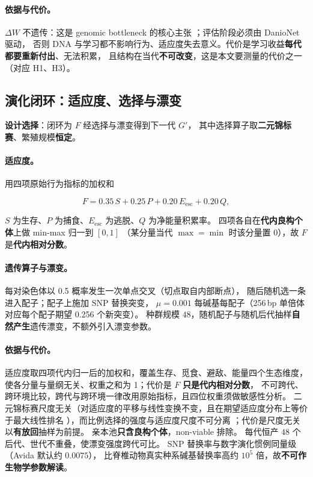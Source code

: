 \paragraph{依据与代价。}$\Delta W$ 不遗传：这是 genomic bottleneck 的核心主张
\citep{bib1_zador2019,bib3_shuvaev2024}；评估阶段必须由 DanioNet 驱动，
否则 DNA 与学习都不影响行为、适应度失去意义。代价是学习收益\textbf{每代都要重新付出}、无法积累，
且结构在当代\textbf{不可改变}，这是本文要测量的代价之一（对应 H1、H3）。

\subsection{演化闭环：适应度、选择与漂变}\label{method:evo}

\textbf{设计选择}：闭环为 $F$ 经选择与漂变得到下一代 $G'$，
其中选择算子取\textbf{二元锦标赛}、繁殖规模\textbf{恒定}。

\paragraph{适应度。}用四项原始行为指标的加权和

\begin{equation}\label{method:eq-fitness}
F=0.35\,S+0.25\,P+0.20\,E_{\mathrm{esc}}+0.20\,Q ,
\end{equation}

$S$ 为生存、$P$ 为捕食、$E_{\mathrm{esc}}$ 为逃脱、$Q$ 为净能量积累率。
四项各自在\textbf{代内良构个体}上做 min-max 归一到 $[0,1]$
（某分量当代 $\max=\min$ 时该分量置 0），故 $F$ 是\textbf{代内相对分数}。

\paragraph{遗传算子与漂变。}每对染色体以 0.5 概率发生一次单点交叉（切点取自内部断点），
随后随机选一条进入配子；配子上施加 SNP 替换突变，
$\mu=0.001$ 每碱基每配子（256\,bp 单倍体对应每个配子期望 0.256 个新突变）。
种群规模 $48$，随机配子与随机后代抽样\textbf{自然产生}遗传漂变，不额外引入漂变参数。

\paragraph{依据与代价。}适应度取四项代内归一后的加权和，覆盖生存、觅食、避敌、能量四个生态维度，
使各分量与量纲无关、权重之和为 1；代价是 $F$ \textbf{只是代内相对分数}，
不可跨代、跨环境比较，跨代与跨环境一律改用原始指标，且四位权重须做敏感性分析。
二元锦标赛尺度无关（对适应度的平移与线性变换不变，且在期望适应度分布上等价于最大线性排名
\citep{bib136_blickle1996,bib137_eiben2015}），而比例选择的强度与适应度尺度不可分离
\citep{bib135_goldberg1991}；代价是尺度无关以\textbf{有放回}抽样为前提。
亲本池\textbf{只含良构个体}，non-viable 排除。
每代恒产 $48$ 个后代、世代不重叠，使漂变强度跨代可比。
SNP 替换率与数字演化惯例同量级（Avida 默认约 $0.0075$），
比脊椎动物真实种系碱基替换率高约 $10^{5}$ 倍，故\textbf{不可作生物学参数解读}。

